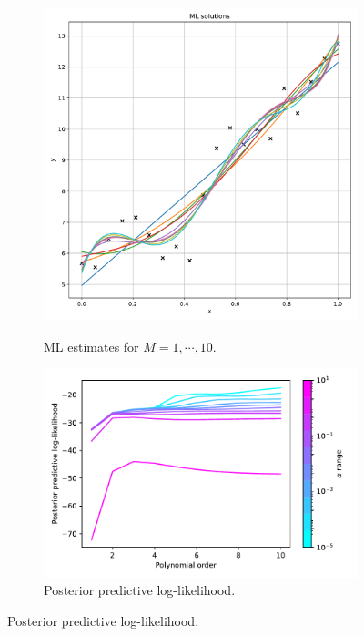 \documentclass{article}
\begin{document}
\begin{figure}
\centering
\begin{subfigure}[b]{.45\textwidth}
\includegraphics[width=\textwidth]{Q2_5.pdf}
\caption{ML estimates for $M = 1, \cdots, 10$.}

\vspace{2ex}

\includegraphics[width=\textwidth]{Q2_7.pdf}
\caption{Posterior predictive log-likelihood.}

\vspace{2ex}


\end{subfigure}
\end{figure}
\end{document}
